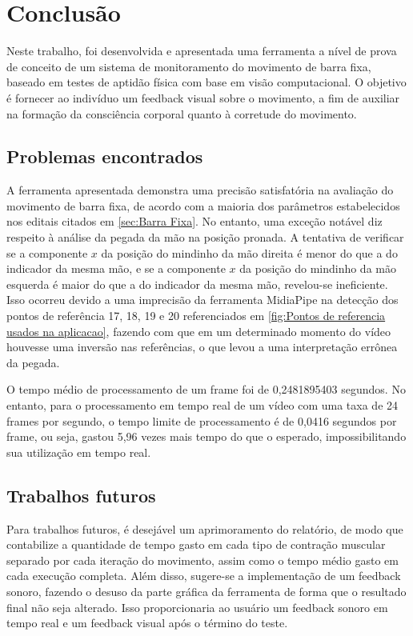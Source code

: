 \chapter{Conclusão}

Neste trabalho, foi desenvolvida e apresentada uma ferramenta a nível de prova de conceito de um sistema de monitoramento do movimento de barra fixa, baseado em testes de aptidão física com base em visão computacional. O objetivo é fornecer ao indivíduo um feedback visual sobre o movimento, a fim de auxiliar na formação da consciência corporal quanto à corretude do movimento.

\section[Problemas encontrados]{Problemas encontrados}\label{sec:Pontos fracos e possiveis melhorias}

A ferramenta apresentada demonstra uma precisão satisfatória na avaliação do movimento de barra fixa, de acordo com a maioria dos parâmetros estabelecidos nos editais citados em \ref{sec:Barra Fixa}. No entanto, uma exceção notável diz respeito à análise da pegada da mão na posição pronada. A tentativa de verificar se a componente $x$ da posição do mindinho da mão direita é menor do que a do indicador da mesma mão, e se a componente $x$ da posição do mindinho da mão esquerda é maior do que a do indicador da mesma mão, revelou-se ineficiente. Isso ocorreu devido a uma imprecisão da ferramenta MidiaPipe na detecção dos pontos de referência 17, 18, 19 e 20 referenciados em \ref{fig:Pontos de referencia usados na aplicacao}, fazendo com que em um determinado momento do vídeo houvesse uma inversão nas referências, o que levou a uma interpretação errônea da pegada.

O tempo médio de processamento de um frame foi de 0,2481895403 segundos. No entanto, para o processamento em tempo real de um vídeo com uma taxa de 24 frames por segundo, o tempo limite de processamento é de 0,0416 segundos por frame, ou seja, gastou 5,96 vezes mais tempo do que o esperado, impossibilitando sua utilização em tempo real.





\section[Trabalhos futuros]{Trabalhos futuros}
Para trabalhos futuros, é desejável um aprimoramento do relatório, de modo que contabilize a quantidade de tempo gasto em cada tipo de contração muscular separado por cada iteração do movimento, assim como o tempo médio gasto em cada execução completa. Além disso, sugere-se a implementação de um feedback sonoro, fazendo o desuso da parte gráfica da ferramenta de forma que o resultado final não seja alterado. Isso proporcionaria ao usuário um feedback sonoro em tempo real e um feedback visual após o término do teste.

